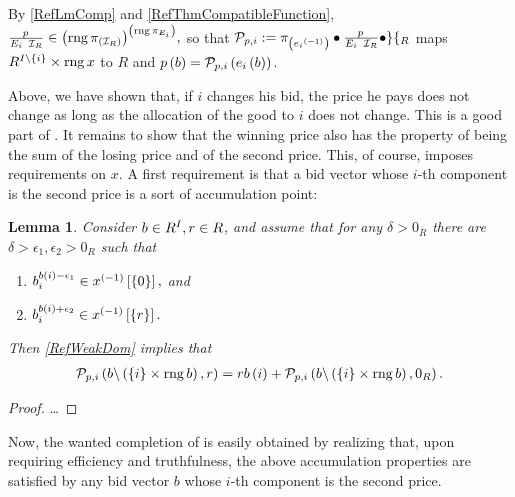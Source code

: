 \documentclass[oneside
]
{article}
\theoremstyle{plain}
\newtheorem{Lm}[Cor]{Lemma}
\theoremstyle{definition}
\DeclareMathOperator{\rng}{rng}
\begin{document}
By \ref{RefLmComp} and \ref{RefThmCompatibleFunction}, $\quotient{p}{E_i}{\id{R}} \in
\mapsFromTo
 {\left(\rng{\toClass{E_i}} \right)}  
{ \left( \rng{\toClass{\left( \id{R}  \right) }} \right) },
$ 
so that 
$ 
\new{p}{i} := 
\toClass{
\left( 
\inv{\strip{i}}
 \right)
} \relcomp \quotient{p}{E_i}{\id{R}} \relcomp \peel{R}
$
maps $ \mapsFromTo{I \sdiff \left\{ i \right\}}{R} \cartprod \rng {x} $ to $R$ and $ p \left( b \right) = \new{p}{i} \left( \strip{i} \left( b \right) \right)$.

Above, we have shown that, if $i$ changes his bid, the price he pays does not change as long as the allocation of the good to $i$ does not change. 
This is a good part of \cite[Proposition~2]{mas-04}.
It remains to show that the winning price also has the property of being the sum of the losing price and of the second price.
This, of course, imposes requirements on $x$. 
A first requirement is that a bid vector whose $i$-th component is the second price is a sort of accumulation point:

\begin{Lm}
Consider $b \in \mapsFromTo{I}{R}, r \in R$, and assume that for any $\delta > 0_R$ there are $\delta > \epsilon_1, \epsilon_2 > 0_R$ such that
\begin{enumerate}
\item
$ \alter{b}{i}{b \left( i \right) - \epsilon_1} \in \im{\inv x}{\left\{ 0 \right\}},$ and
\item
$ \alter{b}{i}{b \left( i \right) + \epsilon_2} \in \im{\inv x}{\left\{ r \right\}} .$
\end{enumerate}
Then \eqref{RefWeakDom} implies that
\begin{align*}
\new{p}{i} \left( b \sdiff \left( \left\{ i \right\} \cartprod \rng b \right), r \right) 
=
r \per b \left( i \right) + 
\new{p}{i} \left( b \sdiff \left( \left\{ i \right\} \cartprod \rng b \right), 0_R \right).
\end{align*}
\end{Lm}

\begin{proof}
\ldots
\end{proof}

Now, the wanted completion of \cite[Proposition~2]{mas-04} is easily obtained by realizing that, upon requiring efficiency and truthfulness, the above accumulation properties are satisfied by any bid vector $b$ whose $i$-th component is the second price. 

\printbibliography
\end{document}
